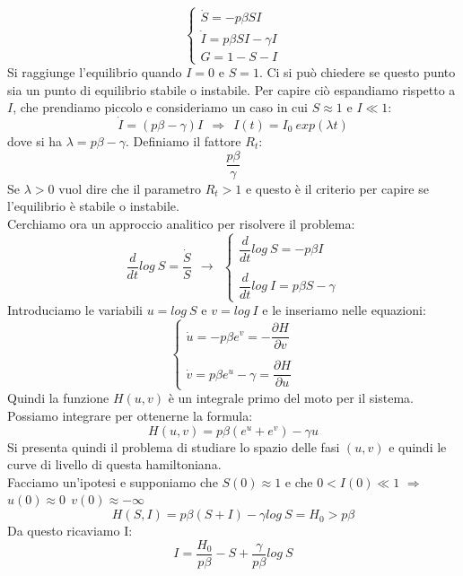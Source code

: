 \documentclass[12pt]{article}
\newcommand{\la}{\lambda}
\begin{document}
\begin{equation}
\begin{cases}
\dot{S} = -p\beta SI \\
\dot{I} = p\beta SI - \gamma I \\
G = 1 - S - I
\end{cases}
\end{equation}
Si raggiunge l'equilibrio quando $I = 0$ e $S = 1$. Ci si può chiedere se questo punto sia un punto di equilibrio stabile o instabile. Per capire ciò espandiamo rispetto a $I$, che prendiamo piccolo e consideriamo un caso in cui $S \approx 1$ e $I \ll 1$:
$$
	\dot{I} = (p \beta - \gamma)I \ \ \Longrightarrow \ \ I(t) = I_0 \ exp(\la t)
$$
dove si ha $\la = p \beta - \gamma$. Definiamo il fattore $R_t$:
\begin{equation}
	\frac{p\beta}{\gamma}
\end{equation}
Se $\la > 0$ vuol dire che il parametro $R_t > 1$ e questo è il criterio per capire se l'equilibrio è stabile o instabile. \\
Cerchiamo ora un approccio analitico per risolvere il problema:
$$
\frac{d}{dt} log \ S = \frac{\dot{S}}{S} \ \ \longrightarrow \ \ \begin{cases}
\dfrac{d}{dt} log \ S = -p\beta I \\  \\
\dfrac{d}{dt} log \ I = p \beta S - \gamma
\end{cases}
$$ 
Introduciamo le variabili $u = log \ S$ e $v = log \ I$ e le inseriamo nelle equazioni:
$$
\begin{cases}
\dot{u} = -p\beta e^v = -\dfrac{\partial H}{\partial v} \\ \\
\dot{v} = p \beta e^u - \gamma = \dfrac{\partial H}{\partial u}
\end{cases}
$$
Quindi la funzione $H(u,v)$ è un integrale primo del moto per il sistema. Possiamo integrare per ottenerne la formula:
\begin{equation}
	H(u,v) = p \beta (e^u + e^v) - \gamma u
\end{equation}
Si presenta quindi il problema di studiare lo spazio delle fasi $(u,v)$ e quindi le curve di livello di questa hamiltoniana. \\
Facciamo un'ipotesi e supponiamo che $S(0) \approx 1$ e che $0 < I(0) \ll 1$ $\Longrightarrow$ $u(0) \approx 0 \ \ v(0) \approx - \infty$ 
$$
H(S,I) = p \beta (S+I) - \gamma log \ S
 = H_0 > p \beta
$$
Da questo ricaviamo I:
$$
	I = \frac{H_0}{p \beta} - S + \frac{\gamma}{p\beta} log \ S
$$
\end{document}
